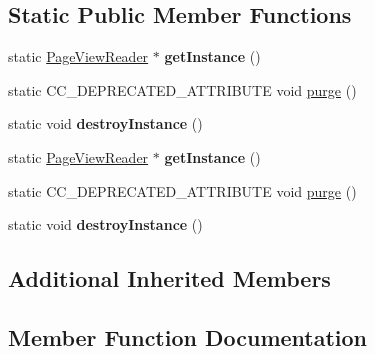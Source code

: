 \subsection*{Static Public Member Functions}
\begin{DoxyCompactItemize}
\item 
\mbox{\label{classcocostudio_1_1PageViewReader_acc53baf3a3ddad0732b3aeb56586e6b1}} 
static \hyperlink{classcocostudio_1_1PageViewReader}{Page\+View\+Reader} $\ast$ {\bfseries get\+Instance} ()
\item 
static C\+C\+\_\+\+D\+E\+P\+R\+E\+C\+A\+T\+E\+D\+\_\+\+A\+T\+T\+R\+I\+B\+U\+TE void \hyperlink{classcocostudio_1_1PageViewReader_ae5a951df9cd9cb44ef6aa152b2e971cc}{purge} ()
\item 
\mbox{\label{classcocostudio_1_1PageViewReader_acfeecb08f701ef849e787b8bead00be4}} 
static void {\bfseries destroy\+Instance} ()
\item 
\mbox{\label{classcocostudio_1_1PageViewReader_a912510c8959821839e476e2525355d65}} 
static \hyperlink{classcocostudio_1_1PageViewReader}{Page\+View\+Reader} $\ast$ {\bfseries get\+Instance} ()
\item 
static C\+C\+\_\+\+D\+E\+P\+R\+E\+C\+A\+T\+E\+D\+\_\+\+A\+T\+T\+R\+I\+B\+U\+TE void \hyperlink{classcocostudio_1_1PageViewReader_ae5a951df9cd9cb44ef6aa152b2e971cc}{purge} ()
\item 
\mbox{\label{classcocostudio_1_1PageViewReader_ab5c57f5d2114def771ccc13e83408c53}} 
static void {\bfseries destroy\+Instance} ()
\end{DoxyCompactItemize}
\subsection*{Additional Inherited Members}


\subsection{Member Function Documentation}
\mbox{\label{classcocostudio_1_1PageViewReader_ae5a951df9cd9cb44ef6aa152b2e971cc}} 
